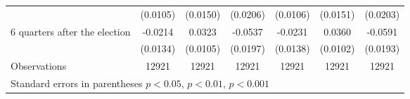 \begin{table}[!ht]
\begin{tabular}{l*{6}{c}}
                    &    (0.0105)         &    (0.0150)         &    (0.0206)         &    (0.0106)         &    (0.0151)         &    (0.0203)         \\
[0,5em]
 6 quarters after the election&     -0.0214         &      0.0323\sym{**} &     -0.0537\sym{**} &     -0.0231         &      0.0360\sym{***}&     -0.0591\sym{**} \\
                    &    (0.0134)         &    (0.0105)         &    (0.0197)         &    (0.0138)         &    (0.0102)         &    (0.0193)         \\
\hline
Observations        &       12921         &       12921         &       12921         &       12921         &       12921         &       12921         \\
\hline\hline
\multicolumn{7}{l}{\footnotesize Standard errors in parentheses \sym{*} \(p<0.05\), \sym{**} \(p<0.01\), \sym{***} \(p<0.001\)}\\
\end{tabular}
\end{table}
